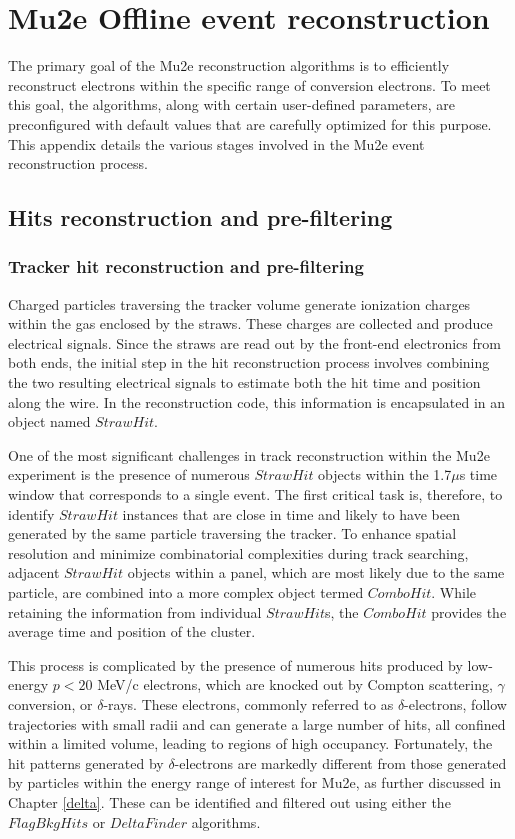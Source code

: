
\chapter{Mu2e Offline event reconstruction}\label{eventreco}

The primary goal of the Mu2e reconstruction algorithms is 
to efficiently reconstruct electrons within the specific range 
of conversion electrons. To meet this goal, the algorithms, 
along with certain user-defined parameters, are preconfigured 
with default values that are carefully optimized for this purpose. 
This appendix details the various stages involved in the Mu2e event reconstruction process.

\section{Hits reconstruction and pre-filtering}
\subsection{Tracker hit reconstruction and pre-filtering}
Charged particles traversing the tracker volume generate 
ionization charges within the gas enclosed by the straws. 
These charges are collected and produce electrical signals. 
Since the straws are read out by the front-end electronics from 
both ends, the initial step in the hit reconstruction process 
involves combining the two resulting electrical signals to 
estimate both the hit time and position along the wire. In the 
reconstruction code, this information is encapsulated in an object named $StrawHit$.

One of the most significant challenges in track reconstruction within 
the Mu2e experiment is the presence of numerous $StrawHit$ 
objects within the 1.7$\mu$s time window that corresponds to 
a single event. The first critical task is, therefore, to identify 
$StrawHit$ instances that are close in time and likely to 
have been generated by the same particle traversing the tracker. To 
enhance spatial resolution and minimize combinatorial complexities 
during track searching, adjacent $StrawHit$ objects within a 
panel, which are most likely due to the same particle, are combined 
into a more complex object termed $ComboHit$. While retaining 
the information from individual $StrawHit$s, the $ComboHit$ provides the average time and position of the cluster.

This process is complicated by the presence of numerous hits produced 
by low-energy $p < 20$ MeV/c electrons, which are knocked 
out by Compton scattering, $\gamma$ conversion, or $\delta$-rays. 
These electrons, commonly referred to as $\delta$-electrons, follow 
trajectories with small radii and can generate a large number of hits, 
all confined within a limited volume, leading to regions of high occupancy. 
Fortunately, the hit patterns generated by $\delta$-electrons are markedly 
different from those generated by particles within the energy range of 
interest for Mu2e, as further discussed in Chapter \ref{delta}. These can be 
identified and filtered out using either the $FlagBkgHits$ or $DeltaFinder$ algorithms.

